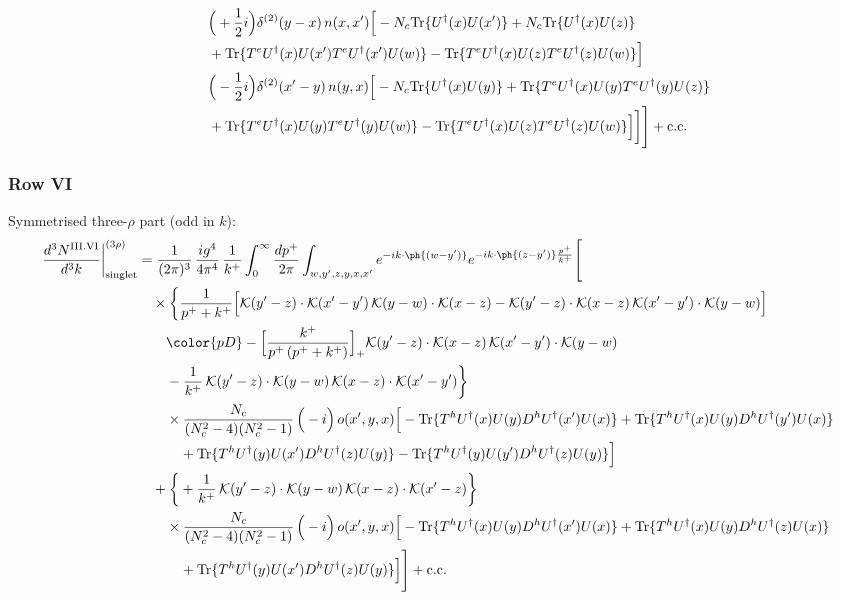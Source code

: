 \begin{align}
&\qquad\quad \Big(+\frac{1}{2}i\Big)\delta^{(2)}(y-x)\,n(x,x')\Big[-N_{c}{\rm Tr}\{U^{\dagger}(x)U(x')\}+N_{c}{\rm Tr}\{U^{\dagger}(x)U(z)\}\notag\\
&\qquad\quad +{\rm Tr}\{T^{e}U^{\dagger}(x)U(x')T^{e}U^{\dagger}(x')U(w)\}-{\rm Tr}\{T^{e}U^{\dagger}(x)U(z)T^{e}U^{\dagger}(z)U(w)\}\Big]\notag\\
&\qquad\quad \Big(-\frac{1}{2}i\Big)\delta^{(2)}(x'-y)\,n(y,x)\Big[-N_{c}{\rm Tr}\{U^{\dagger}(x)U(y)\}+{\rm Tr}\{T^{e}U^{\dagger}(x)U(y)T^{e}U^{\dagger}(y)U(z)\}\notag\\
&\qquad\quad +{\rm Tr}\{T^{e}U^{\dagger}(x)U(y)T^{e}U^{\dagger}(y)U(w)\}-{\rm Tr}\{T^{e}U^{\dagger}(x)U(z)T^{e}U^{\dagger}(z)U(w)\}\Big]\bigg]\Bigg]+{\rm c.c.}\label{eq:E-III.V-2}
\end{align}
\subsubsection*{Row VI}
Symmetrised three-$\rho$ part (odd in $k$):
\begin{align}
\frac{d^{3}N^{\rm III.VI}}{d^{3}k}\bigg|^{(3\rho)}_{\rm singlet}&=\frac{1}{(2\pi)^{3}}\,\frac{ig^{4}}{4\pi^{4}}\,\frac{1}{k^{+}}\int_{0}^{\infty}\frac{dp^{+}}{2\pi}\int_{w,y',z,y,x,x'}e^{-ik\cdot\ph{(w-y')}}e^{-ik\cdot\ph{(z-y')}\frac{p^{+}}{k^{+}}}\Bigg[\notag\\
&\quad\times\bigg\{\frac{1}{p^{+}+k^{+}}\Big[\mathcal{K}(y'-z)\cdot\mathcal{K}(x'-y')\,\mathcal{K}(y-w)\cdot\mathcal{K}(x-z)-\mathcal{K}(y'-z)\cdot\mathcal{K}(x-z)\,\mathcal{K}(x'-y')\cdot\mathcal{K}(y-w)\Big]\notag\\
&\qquad{\color{pD}-\Big[\frac{k^{+}}{p^{+}\,(p^{+}+k^{+})}\Big]_{+}\mathcal{K}(y'-z)\cdot\mathcal{K}(x-z)\,\mathcal{K}(x'-y')\cdot\mathcal{K}(y-w)}\notag\\
&\qquad-\frac{1}{k^{+}}\,\mathcal{K}(y'-z)\cdot\mathcal{K}(y-w)\,\mathcal{K}(x-z)\cdot\mathcal{K}(x'-y')\bigg\}\notag\\
&\qquad\times \frac{N_{c}}{(N_{c}^{2}-4)(N_{c}^{2}-1)}\,\Big(-i\Big)\,o(x',y,x)\Big[-{\rm Tr}\{T^{h}U^{\dagger}(x)U(y)D^{h}U^{\dagger}(x')U(x)\}+{\rm Tr}\{T^{h}U^{\dagger}(x)U(y)D^{h}U^{\dagger}(y')U(x)\}\notag\\
&\qquad\quad +{\rm Tr}\{T^{h}U^{\dagger}(y)U(x')D^{h}U^{\dagger}(z)U(y)\}-{\rm Tr}\{T^{h}U^{\dagger}(y)U(y')D^{h}U^{\dagger}(z)U(y)\}\Big]\notag\\
&\quad+\bigg\{+\frac{1}{k^{+}}\,\mathcal{K}(y'-z)\cdot\mathcal{K}(y-w)\,\mathcal{K}(x-z)\cdot\mathcal{K}(x'-z)\bigg\}\notag\\
&\qquad\times \frac{N_{c}}{(N_{c}^{2}-4)(N_{c}^{2}-1)}\,\Big(-i\Big)\,o(x',y,x)\Big[-{\rm Tr}\{T^{h}U^{\dagger}(x)U(y)D^{h}U^{\dagger}(x')U(x)\}+{\rm Tr}\{T^{h}U^{\dagger}(x)U(y)D^{h}U^{\dagger}(z)U(x)\}\notag\\
&\qquad\quad +{\rm Tr}\{T^{h}U^{\dagger}(y)U(x')D^{h}U^{\dagger}(z)U(y)\}\Big]\Bigg]+{\rm c.c.}\label{eq:E-III.VI-3}
\end{align}

